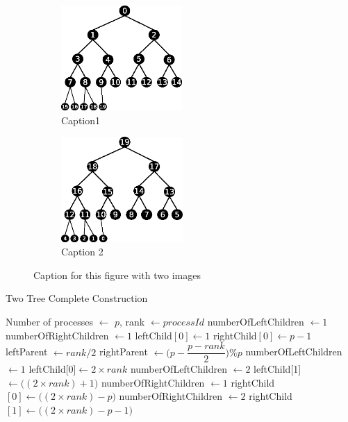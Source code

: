 \documentclass[sigplan,review,anonymous]{acmart}\settopmatter{printfolios=true,printccs=false,printacmref=false}
\begin{document}
 \begin{figure}[h]
 
\begin{subfigure}{0.5\textwidth}
\includegraphics[width=0.5\linewidth, height=4cm]{images/complete-T1-gap.eps} 
\caption{Caption1}
\label{fig:CT1}
\end{subfigure}
\begin{subfigure}{0.5\textwidth}
\includegraphics[width=0.5\linewidth, height=4cm]{images/complete-T2-gap.eps}
\caption{Caption 2}
\label{fig:CT2}
\end{subfigure}
 
\caption{Caption for this figure with two images}
\label{fig:twoTreeC}
\end{figure}


\begin{algorithm}
 \scriptsize
\caption{Two Tree Complete Construction}\label{alg:TwoTreeComp}
\begin{algorithmic}[1]
\REQUIRE Number of processes $\leftarrow$ \(p\), rank $\leftarrow processId$ 
    \STATE numberOfLeftChildren $ \leftarrow 1$
    \STATE numberOfRightChildren $ \leftarrow 1$
    \STATE leftChild$[0] \leftarrow 1$
    \STATE rightChild$[0] \leftarrow p-1$
    \STATE leftParent $ \leftarrow rank / 2$
    \STATE rightParent $ \leftarrow \big(p-\dfrac{p-rank}{2}\big)\%p$
         \STATE numberOfLeftChildren $ \leftarrow 1$
         \STATE leftChild[0]$ \leftarrow 2 \times rank$
    \ENDIF
         \STATE numberOfLeftChildren $ \leftarrow 2$
         \STATE leftChild[1]$ \leftarrow \big((2 \times rank) + 1\big)$
    \ENDIF
         \STATE numberOfRightChildren $ \leftarrow 1$
         \STATE rightChild$[0] \leftarrow \big((2 \times rank) - p\big)$
    \ENDIF
         \STATE numberOfRightChildren $ \leftarrow 2$
         \STATE rightChild$[1] \leftarrow \big((2 \times rank) - p - 1\big)$
    \ENDIF
\ENDIF
\end{algorithmic}
\end{algorithm}
\end{document}
